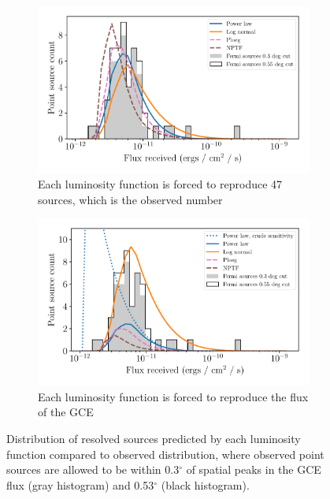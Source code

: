 \documentclass[a4paper,11pt]{article}
\begin{document}
\begin{figure}
    \centering
    \begin{subfigure}[b]{0.47\textwidth}
        \includegraphics[width=\textwidth]{figs/flux-distro-fix-count.pdf}
        \caption{Each luminosity function is forced to reproduce 47 sources, which is the observed number}
        \label{fig:flux-distro-fix-count}
    \end{subfigure}
    \hfill
    \begin{subfigure}[b]{0.47\textwidth}
        \includegraphics[width=\textwidth]{figs/flux-distro-fix-flux.pdf}
        \caption{Each luminosity function is forced to reproduce the flux of the GCE}
        \label{fig:flux-distro-fix-flux}
    \end{subfigure}
    \caption{Distribution of resolved sources predicted by each luminosity function compared to observed distribution, where observed point sources are allowed to be within 0.3$^\circ$ of spatial peaks in the GCE flux (gray histogram) and 0.53$^\circ$ (black histogram).}
\end{figure}
\end{document}
